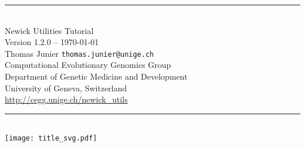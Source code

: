 \documentclass[a4paper,10pt]{report}
\newcommand{\Hrule}[1]{\rule{\linewidth}{#1}}
\begin{document}
\begin{titlepage}
\begin{center}
\Hrule{0.5mm} \\[0.8cm]
{\Huge Newick Utilities Tutorial} \\[0.5cm]
Version 1.2.0 -- \today \\
Thomas Junier \texttt{thomas.junier@unige.ch} \\
Computational Evolutionary Genomics Group \\
Department of Genetic Medicine and Development \\
University of Geneva, Switzerland \\
\url{http://cegg.unige.ch/newick_utils}
\Hrule{0.5mm}
\\[2cm]
\texttt{[image: title\_svg.pdf]}
\end{center}
\end{titlepage}

\tableofcontents











\appendix










% 

% 
\end{document}
